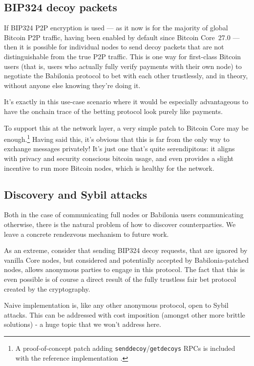 \documentclass[11pt]{article}
\begin{document}
\subsection{BIP324 decoy packets}

If BIP324 \cite{bip324} P2P encryption is used --- as it now is for the majority of global Bitcoin P2P traffic, having been enabled by default since Bitcoin Core~27.0 \cite{optechv2} --- then it is possible for individual nodes to send decoy packets that are not distinguishable from the true P2P traffic. This is one way for first-class Bitcoin users (that is, users who actually fully verify payments with their own node) to negotiate the Babilonia protocol to bet with each other trustlessly, and in theory, without anyone else knowing they're doing it.

It's exactly in this use-case scenario where it would be especially advantageous to have the onchain trace of the betting protocol look purely like payments.

To support this at the network layer, a very simple patch to Bitcoin Core may be enough.\footnote{A proof-of-concept patch adding \texttt{senddecoy}/\texttt{getdecoys} RPCs is included with the reference implementation \cite{babilonia}.} Having said this, it's obvious that this is far from the only way to exchange messages privately! It's just one that's quite serendipitous: it aligns with privacy and security conscious bitcoin usage, and even provides a slight incentive to run more Bitcoin nodes, which is healthy for the network.

\subsection{Discovery and Sybil attacks}

Both in the case of communicating full nodes or Babilonia users communicating otherwise, there is the natural problem of how to discover counterparties. We leave a concrete rendezvous mechanism to future work.

As an extreme, consider that sending BIP324 decoy requests, that are ignored by vanilla Core nodes, but considered and potentially accepted by Babilonia-patched nodes, allows anonymous parties to engage in this protocol. The fact that this is even possible is of course a direct result of the fully trustless fair bet protocol created by the cryptography.

Naive implementation is, like any other anonymous protocol, open to Sybil attacks. This can be addressed with cost imposition (amongst other more brittle solutions) - a huge topic that we won't address here.
\end{document}
